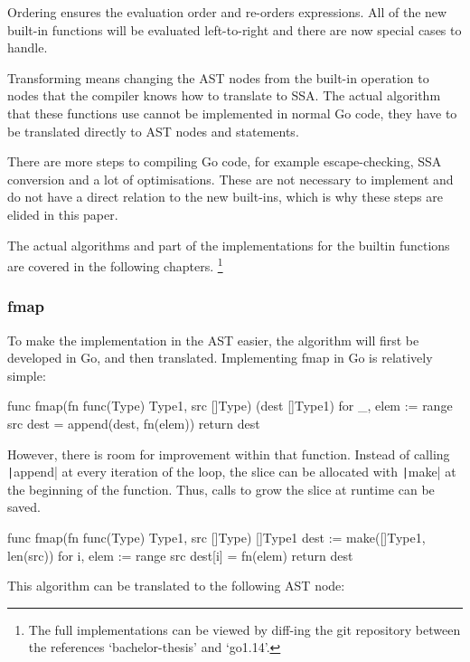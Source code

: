 Ordering ensures the evaluation order and re-orders expressions. All of
the new built-in functions will be evaluated left-to-right and there are now
special cases to handle.

Transforming means changing the AST nodes from the built-in operation to
nodes that the compiler knows how to translate to SSA. The actual algorithm
that these functions use cannot be implemented in normal Go code, they have to be
translated directly to AST nodes and statements.

There are more steps to compiling Go code, for example escape-checking,
SSA conversion and a lot of optimisations. These are not necessary to
implement and do not have a direct relation to the new built-ins, which
is why these steps are elided in this paper.

The actual algorithms and part of the implementations for the builtin
functions are covered in the following chapters.
\footnote{
    The full implementations can be viewed by diff-ing the git repository
    between the references `bachelor-thesis' and `go1.14'\autocite{ba-go1-14-thesis-diff}.
}

\subsubsection{fmap}\label{ch:impl-fmap}

To make the implementation in the AST easier, the algorithm will first be
developed in Go, and then translated. Implementing fmap in Go is relatively
simple:

\begin{code}
    \label{code:fmap-go}
    \begin{gocode}
func fmap(fn func(Type) Type1, src []Type) (dest []Type1) {
    for _, elem := range src {
        dest = append(dest, fn(elem))
    }
    return dest
}
\end{gocode}
\end{code}
However, there is room for improvement within that function. Instead
of calling \texttt|append| at every iteration of the loop, the slice can
be allocated with \texttt|make| at the beginning of the function. Thus,
calls to grow the slice at runtime can be saved.

\begin{code}
    \label{code:fmap-go-improved}
    \begin{gocode}
func fmap(fn func(Type) Type1, src []Type) []Type1 {
    dest := make([]Type1, len(src))
    for i, elem := range src {
        dest[i] = fn(elem)
    }
    return dest
}
    \end{gocode}
\end{code}
This algorithm can be translated to the following AST node:

